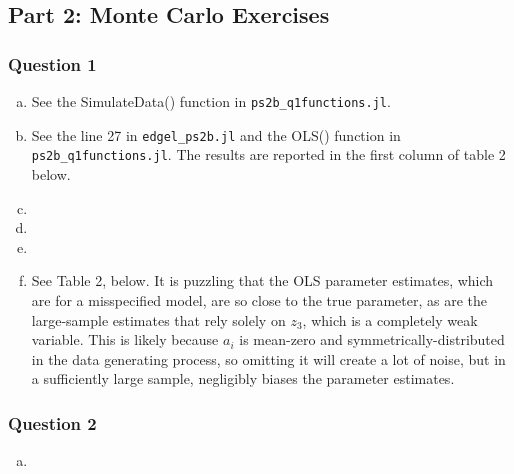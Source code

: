 \documentclass{article}
\begin{document}
\subsection*{Part 2: Monte Carlo Exercises}
\subsubsection*{Question 1}
\begin{enumerate}[a)]
    \item See the SimulateData() function in \texttt{ps2b\_q1functions.jl}.
    \item See the line 27 in \texttt{edgel\_ps2b.jl} and the OLS() function in \texttt{ps2b\_q1functions.jl}. The results are reported in the first column of table 2 below.
    \item 
    \item 
    \item 
    \item See Table 2, below. It is puzzling that the OLS parameter estimates, which are for a misspecified model, are so close to the true parameter, as are the large-sample estimates that rely solely on $z_3$, which is a completely weak variable. This is likely because $a_i$ is mean-zero and symmetrically-distributed in the data generating process, so omitting it will create a lot of noise, but in a sufficiently large sample, negligibly biases the parameter estimates.
        \begin{center}
                
        \end{center}
\end{enumerate}


\subsubsection*{Question 2}
\begin{enumerate}[a)]
    \item 
\end{enumerate}
\end{document}
